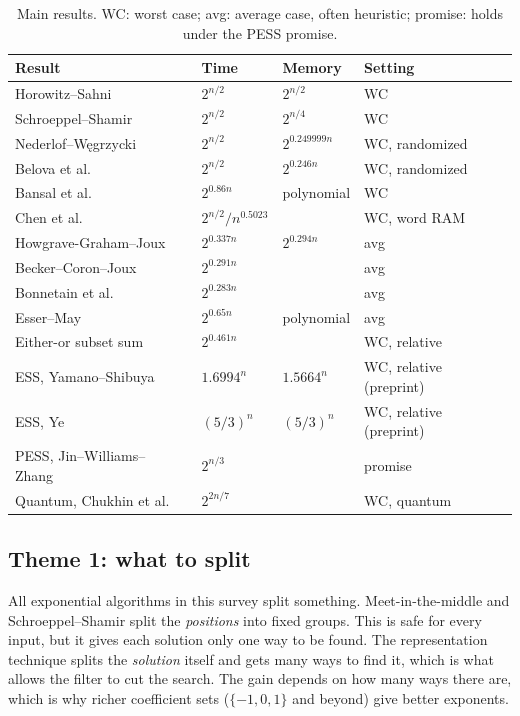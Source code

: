 \documentclass[11pt]{article}
\begin{document}
\begin{table}[t]
\centering
\caption{Main results. WC: worst case; avg: average case, often heuristic;
promise: holds under the PESS promise.}
\label{tab:landscape}
\small
\begin{tabular}{p{4.5cm}p{3.4cm}p{2.6cm}p{3.4cm}}
\toprule
Result & Time & Memory & Setting \\
\midrule
Horowitz--Sahni~\cite{hs} & $2^{n/2}$ & $2^{n/2}$ & WC \\
Schroeppel--Shamir~\cite{ss} & $2^{n/2}$ & $2^{n/4}$ & WC \\
Nederlof--W\k{e}grzycki~\cite{nw} & $2^{n/2}$ & $2^{0.249999n}$ & WC, randomized \\
Belova et al.~\cite{bckm} & $2^{n/2}$ & $2^{0.246n}$ & WC, randomized \\
Bansal et al.~\cite{bgnv} & $2^{0.86n}$ & polynomial & WC \\
Chen et al.~\cite{chen} & $2^{n/2}/n^{0.5023}$ & & WC, word RAM \\
Howgrave-Graham--Joux~\cite{hgj} & $2^{0.337n}$ & $2^{0.294n}$ & avg \\
Becker--Coron--Joux~\cite{bcj} & $2^{0.291n}$ & & avg \\
Bonnetain et al.~\cite{bbss} & $2^{0.283n}$ & & avg \\
Esser--May~\cite{em} & $2^{0.65n}$ & polynomial & avg \\
Either-or subset sum~\cite{rand} & $2^{0.461n}$ & & WC, relative \\
ESS, Yamano--Shibuya~\cite{ys} & $1.6994^n$ & $1.5664^n$ & WC, relative (preprint) \\
ESS, Ye~\cite{ye} & $(5/3)^n$ & $(5/3)^n$ & WC, relative (preprint) \\
PESS, Jin--Williams--Zhang~\cite{jwz} & $2^{n/3}$ & & promise \\
Quantum, Chukhin et al.~\cite{cklm} & $2^{2n/7}$ & & WC, quantum \\
\bottomrule
\end{tabular}
\end{table}

\subsection{Theme 1: what to split}
All exponential algorithms in this survey split something. Meet-in-the-middle
and Schroeppel--Shamir split the \emph{positions} into fixed groups. This is
safe for every input, but it gives each solution only one way to be found. The
representation technique splits the \emph{solution} itself and gets many ways
to find it, which is what allows the filter to cut the search. The gain
depends on how many ways there are, which is why richer coefficient sets
($\{-1,0,1\}$ and beyond) give better exponents.
\end{document}

